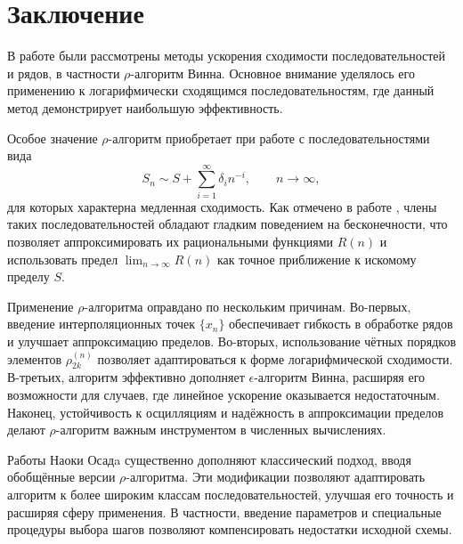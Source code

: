 \documentclass[14pt, a4paper]{extarticle}
\theoremstyle{definition}
\theoremstyle{remark}
\begin{document}
\section{Заключение}

В работе были рассмотрены методы ускорения сходимости последовательностей и
рядов, в частности $\rho$-алгоритм Винна. Основное внимание уделялось его
применению к логарифмически сходящимся последовательностям, где данный метод
демонстрирует наибольшую эффективность. 

Особое значение $\rho$-алгоритм приобретает при работе с последовательностями
вида
\[
S_{n} \sim S + \sum_{i = 1}^{\infty} \delta_{i} n^{-i}, \qquad n \to \infty,
\]
для которых характерна медленная сходимость. Как отмечено в работе
\cite{Weniger2003}, члены таких последовательностей обладают гладким
поведением на бесконечности, что позволяет аппроксимировать их рациональными
функциями $R(n)$ и использовать предел $\lim_{n \to \infty} R(n)$ как точное
приближение к искомому пределу $S$.

Применение $\rho$-алгоритма оправдано по нескольким причинам. Во-первых,
введение интерполяционных точек $\{x_n\}$ обеспечивает гибкость в обработке
рядов и улучшает аппроксимацию пределов. Во-вторых, использование чётных
порядков элементов $\rho_{2k}^{(n)}$ позволяет адаптироваться к форме
логарифмической сходимости. В-третьих, алгоритм эффективно дополняет
$\epsilon$-алгоритм Винна, расширяя его возможности для случаев, где линейное
ускорение оказывается недостаточным. Наконец, устойчивость к осцилляциям и
надёжность в аппроксимации пределов делают $\rho$-алгоритм важным инструментом
в численных вычислениях.


Работы Наоки Осадa \cite{Osada1993} существенно дополняют классический подход, вводя обобщённые версии $\rho$-алгоритма. Эти модификации позволяют адаптировать алгоритм к более широким классам последовательностей, улучшая его точность и расширяя сферу применения. В частности, введение параметров и специальные процедуры выбора шагов позволяют компенсировать недостатки исходной схемы.

\newpage
\nocite{*}
\printbibliography[
heading=bibintoc,
title={Список литературы}
]


\end{document}
